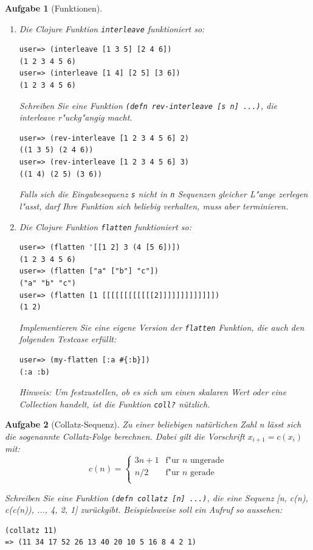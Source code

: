 \documentclass[11pt,a4paper]{article}
\newcounter{numb}
\theoremstyle{break}
\newtheorem{aufgabe}{Aufgabe}[numb]
\begin{document}
\begin{aufgabe}[Funktionen]
\begin{enumerate}[label=\alph*)]
\item Die Clojure Funktion \texttt{interleave} funktioniert so:
\begin{verbatim}
user=> (interleave [1 3 5] [2 4 6])
(1 2 3 4 5 6)
user=> (interleave [1 4] [2 5] [3 6])
(1 2 3 4 5 6)
\end{verbatim}

Schreiben Sie eine Funktion \texttt{(defn rev-interleave [s n] ...)}, die interleave r"uckg"angig macht. 
\begin{verbatim}
user=> (rev-interleave [1 2 3 4 5 6] 2)
((1 3 5) (2 4 6))
user=> (rev-interleave [1 2 3 4 5 6] 3)
((1 4) (2 5) (3 6))
\end{verbatim}

Falls sich die Eingabesequenz \texttt{s} nicht in \texttt{n} Sequenzen gleicher L"ange zerlegen l"asst, darf Ihre Funktion sich beliebig verhalten, muss aber terminieren.
\item Die Clojure Funktion \texttt{flatten} funktioniert so:
\begin{verbatim}
user=> (flatten '[[1 2] 3 (4 [5 6])])
(1 2 3 4 5 6)
user=> (flatten ["a" ["b"] "c"])
("a" "b" "c")
user=> (flatten [1 [[[[[[[[[[[[2]]]]]]]]]]]]])
(1 2)
\end{verbatim}
Implementieren Sie eine eigene Version der \texttt{flatten} Funktion, die auch den folgenden Testcase erf\"ullt:
\begin{verbatim}
user=> (my-flatten [:a #{:b}])
(:a :b)
\end{verbatim}

Hinweis: Um festzustellen, ob es sich um einen skalaren Wert oder eine Collection handelt, ist die Funktion \verb|coll?| n\"utzlich.


\end{enumerate}

\end{aufgabe}

\begin{aufgabe}[Collatz-Sequenz]
Zu einer beliebigen nat\"urlichen Zahl n l\"asst sich die sogenannte Collatz-Folge berechnen.
Dabei gilt die Vorschrift $x_{i+1} = c(x_i)$ mit:
\begin{equation*}
   c(n) =
   \begin{cases}
     3n+1 & \text{f"ur } n \text{ ungerade} \\
     n/2  & \text{f"ur } n \text{ gerade} \\
   \end{cases}
\end{equation*}

Schreiben Sie eine Funktion \texttt{(defn collatz [n] ...)}, die eine Sequenz [n, c(n), c(c(n)), ..., 4, 2, 1] zur\"uckgibt. Beispielsweise soll ein Aufruf so aussehen:

\begin{verbatim}
(collatz 11)
=> (11 34 17 52 26 13 40 20 10 5 16 8 4 2 1)
\end{verbatim}
\end{aufgabe}
\end{document}

